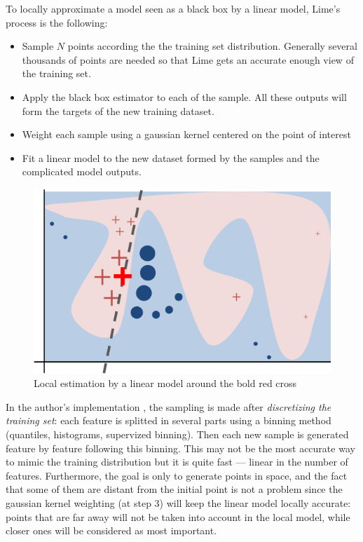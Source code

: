 \documentclass[a4paper,11pt]{kth-mag}
\begin{document}
To locally approximate a model seen as a black box by a linear model, Lime's process is the following:

\begin{itemize}
	\item Sample $N$ points according the the training set distribution. Generally several thousands of points are needed so that Lime gets an accurate enough view of the training set.
	\item Apply the black box estimator to each of the sample. All these outputs will form the targets of the new training dataset.
	\item Weight each sample using a gaussian kernel centered on the point of interest
	\item Fit a linear model to the new dataset formed by the samples and the complicated model outputs.
\end{itemize}

\begin{figure}[!h]
	\centering
   	\def\svgwidth{\columnwidth}
	\includegraphics{lime-schema.png}
    \caption{Local estimation by a linear model around the bold red cross}
\end{figure}

In the author's implementation \cite{limeGitHub}, the sampling is made after \textit{discretizing the training set}: each feature is splitted in several parts using a binning method (quantiles, histograms, supervized binning). Then each new sample is generated feature by feature following this binning. This may not be the most accurate way to mimic the training distribution but it is quite fast --- linear in the number of features. Furthermore, the goal is only to generate points in space, and the fact that some of them are distant from the initial point is not a problem since the gaussian kernel weighting (at step 3) will keep the linear model locally accurate: points that are far away will not be taken into account in the local model, while closer ones will be considered as most important.
\end{document}
